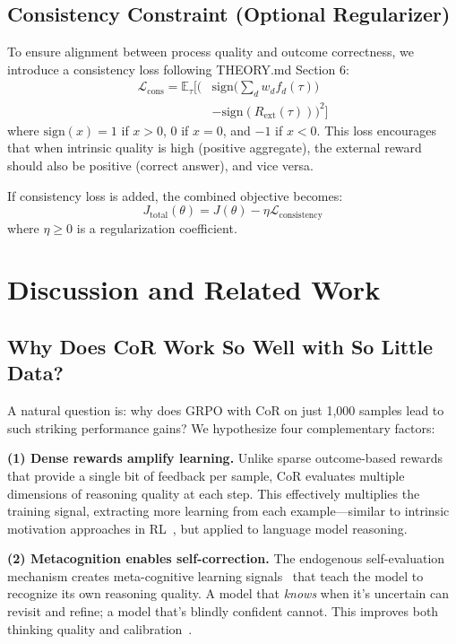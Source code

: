 \documentclass{article}
\theoremstyle{plain}
\theoremstyle{definition}
\theoremstyle{remark}
\begin{document}
\subsection{Consistency Constraint (Optional Regularizer)}

To ensure alignment between process quality and outcome correctness, we introduce a consistency loss following THEORY.md Section 6:
\begin{align}
\mathcal{L}_{\text{cons}} = \mathbb{E}_{\tau} \Big[ \big( & \text{sign}\big(\textstyle\sum_{d} w_d f_d(\tau)\big) \nonumber \\
& - \text{sign}(R_{\text{ext}}(\tau)) \big)^2 \Big]
\end{align}
where $\text{sign}(x) = 1$ if $x > 0$, $0$ if $x = 0$, and $-1$ if $x < 0$. This loss encourages that when intrinsic quality is high (positive aggregate), the external reward should also be positive (correct answer), and vice versa.

If consistency loss is added, the combined objective becomes:
\begin{equation}
J_{\text{total}}(\theta) = J(\theta) - \eta \mathcal{L}_{\text{consistency}}
\end{equation}
where $\eta \geq 0$ is a regularization coefficient.

\section{Discussion and Related Work}
\label{sec:disc}

\subsection{Why Does CoR Work So Well with So Little Data?}

A natural question is: why does GRPO with CoR on just 1,000 samples lead to such striking performance gains? We hypothesize four complementary factors:

\textbf{(1) Dense rewards amplify learning.} Unlike sparse outcome-based rewards that provide a single bit of feedback per sample, CoR evaluates multiple dimensions of reasoning quality at each step. This effectively multiplies the training signal, extracting more learning from each example---similar to intrinsic motivation approaches in RL~\citep{pathak2017curiosity, oudeyer2007intrinsic}, but applied to language model reasoning.

\textbf{(2) Metacognition enables self-correction.} The endogenous self-evaluation mechanism creates meta-cognitive learning signals~\citep{kadavath2022language, xiong2024can} that teach the model to recognize its own reasoning quality. A model that \textit{knows} when it's uncertain can revisit and refine; a model that's blindly confident cannot. This improves both thinking quality and calibration~\citep{guo2017calibration, steyvers2024calibration_gap, geng2024calibration_survey}.
\end{document}
